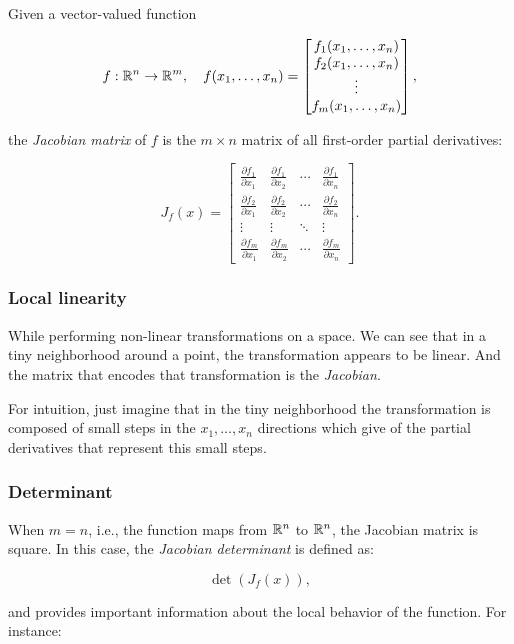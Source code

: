 Given a vector-valued function

\[
    f : \mathbb{R}^n \rightarrow \mathbb{R}^m, \quad f(x_1, \ldots, x_n) = 
    \begin{bmatrix}
    f_1(x_1, \ldots, x_n) \\
    f_2(x_1, \ldots, x_n) \\
    \vdots \\
    f_m(x_1, \ldots, x_n)
    \end{bmatrix},
\]

the \emph{Jacobian matrix} of \(f\) is the \(m \times n\) matrix of all first-order partial derivatives:

\[
    J_f(x) = 
    \begin{bmatrix}
    \frac{\partial f_1}{\partial x_1} & \frac{\partial f_1}{\partial x_2} & \cdots & \frac{\partial f_1}{\partial x_n} \\
    \frac{\partial f_2}{\partial x_1} & \frac{\partial f_2}{\partial x_2} & \cdots & \frac{\partial f_2}{\partial x_n} \\
    \vdots & \vdots & \ddots & \vdots \\
    \frac{\partial f_m}{\partial x_1} & \frac{\partial f_m}{\partial x_2} & \cdots & \frac{\partial f_m}{\partial x_n}
    \end{bmatrix}.
\]

\subsubsection{Local linearity}

While performing non-linear transformations on a space. We can see that in a tiny neighborhood
around a point, the transformation appears to be linear. And the matrix that encodes that
transformation is the \emph{Jacobian}.

For intuition, just imagine that in the tiny neighborhood the transformation is composed
of small steps in the \(x_1, \dots, x_n\) directions which give of the partial derivatives that
represent this small steps. 

\subsubsection{Determinant}
When \(m = n\), i.e., the function maps from \(\mathbb{R}^n\) to \(\mathbb{R}^n\), the Jacobian matrix is square. 
In this case, the \emph{Jacobian determinant} is defined as:

\[
    \det(J_{f}(x)),
\]

and provides important information about the local behavior of the function. For instance:

